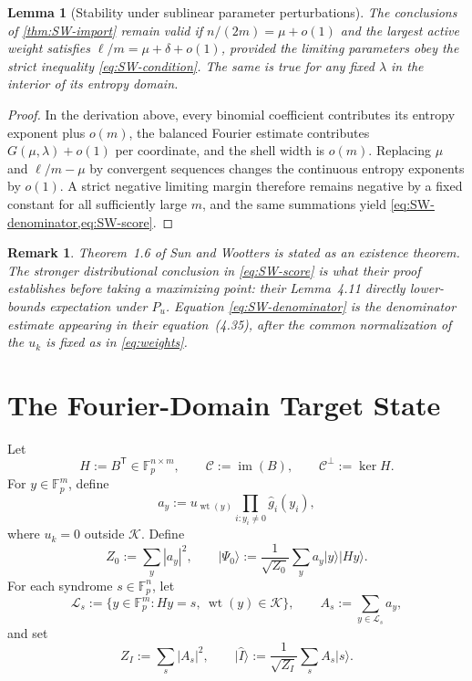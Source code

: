 \documentclass[10pt,a4paper]{amsart}
\newtheorem{lemma}[theorem]{Lemma}
\newtheorem{remark}[theorem]{Remark}
\newcommand{\F}{\mathbb{F}}
\newcommand{\C}{\mathcal{C}}
\newcommand{\Kcal}{\mathcal{K}}
\newcommand{\Lcal}{\mathcal{L}}
\newcommand{\wt}{\operatorname{wt}}
\newcommand{\ket}[1]{\lvert #1\rangle}
\newcommand{\abs}[1]{\left\lvert #1\right\rvert}
\begin{document}
\begin{lemma}[Stability under sublinear parameter perturbations]
\label{lem:SW-stability}
The conclusions of \cref{thm:SW-import} remain valid if $n/(2m)=\mu+o(1)$ and the largest active weight satisfies $\ell/m=\mu+\delta+o(1)$, provided the limiting parameters obey the strict inequality \cref{eq:SW-condition}.  The same is true for any fixed $\lambda$ in the interior of its entropy domain.
\end{lemma}

\begin{proof}
In the derivation above, every binomial coefficient contributes its entropy exponent plus $o(m)$, the balanced Fourier estimate contributes $G(\mu,\lambda)+o(1)$ per coordinate, and the shell width is $o(m)$.  Replacing $\mu$ and $\ell/m-\mu$ by convergent sequences changes the continuous entropy exponents by $o(1)$.  A strict negative limiting margin therefore remains negative by a fixed constant for all sufficiently large $m$, and the same summations yield \cref{eq:SW-denominator,eq:SW-score}.
\end{proof}

\begin{remark}
Theorem~1.6 of Sun and Wootters is stated as an existence theorem.  The stronger distributional conclusion in \cref{eq:SW-score} is what their proof establishes before taking a maximizing point: their Lemma~4.11 directly lower-bounds expectation under $P_u$.  Equation \eqref{eq:SW-denominator} is the denominator estimate appearing in their equation~(4.35), after the common normalization of the $u_k$ is fixed as in \cref{eq:weights}.
\end{remark}

\section{The Fourier-Domain Target State}

Let
\begin{equation}
   H:=B^{\mathsf T}\in\F_p^{n\times m},
   \qquad \C:=\operatorname{im}(B),
   \qquad
   \C^\perp:=\ker H.
   \label{eq:H-code}
\end{equation}
For $y\in\F_p^m$, define
\begin{equation}
   a_y:=u_{\wt(y)}\prod_{i:y_i\ne0}\widehat g_i(y_i),
   \label{eq:ay}
\end{equation}
where $u_k=0$ outside $\Kcal$.  Define
\begin{equation}
   Z_0:=\sum_y\abs{a_y}^2,
   \qquad
   \ket{\Psi_0}:=\frac1{\sqrt{Z_0}}\sum_y a_y\ket{y}\ket{Hy}.
   \label{eq:labeled-state}
\end{equation}
For each syndrome $s\in\F_p^n$, let
\begin{equation}
   \Lcal_s:=\{y\in\F_p^m:Hy=s,\ \wt(y)\in\Kcal\},
   \qquad
   A_s:=\sum_{y\in\Lcal_s}a_y,
   \label{eq:fibers}
\end{equation}
and set
\begin{equation}
   Z_I:=\sum_s\abs{A_s}^2,
   \qquad
   \ket{\widehat I}:=\frac1{\sqrt{Z_I}}\sum_sA_s\ket{s}.
   \label{eq:ideal-syndrome}
\end{equation}
\end{document}
